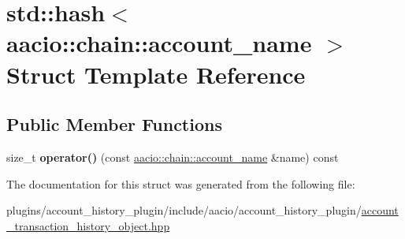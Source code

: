 \hypertarget{structstd_1_1hash_3_01aacio_1_1chain_1_1account__name_01_4}{}\section{std\+:\+:hash$<$ aacio\+:\+:chain\+:\+:account\+\_\+name $>$ Struct Template Reference}
\label{structstd_1_1hash_3_01aacio_1_1chain_1_1account__name_01_4}
\subsection*{Public Member Functions}
\begin{DoxyCompactItemize}
\item 
\mbox{\label{structstd_1_1hash_3_01aacio_1_1chain_1_1account__name_01_4_aadb163fffbf74004b7497cc1b25bb741}} 
size\+\_\+t {\bfseries operator()} (const \mbox{\hyperlink{structaacio_1_1chain_1_1name}{aacio\+::chain\+::account\+\_\+name}} \&name) const
\end{DoxyCompactItemize}


The documentation for this struct was generated from the following file\+:\begin{DoxyCompactItemize}
\item 
plugins/account\+\_\+history\+\_\+plugin/include/aacio/account\+\_\+history\+\_\+plugin/\mbox{\hyperlink{account__transaction__history__object_8hpp}{account\+\_\+transaction\+\_\+history\+\_\+object.\+hpp}}\end{DoxyCompactItemize}
